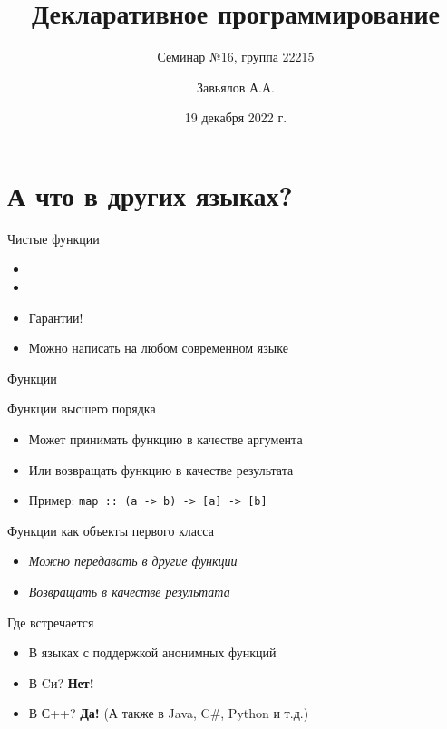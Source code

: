 \documentclass{beamer}
\title{Декларативное программирование}
\subtitle{Семинар №16, группа 22215}
\author{Завьялов А.А.}
\date{19 декабря 2022 г.}
\institute{Кафедра систем информатики ФИТ НГУ}
\newcommand{\hs}[1]{\texttt{#1}}
\begin{document}
  \maketitle
\section{А что в других языках?}
\begin{frame}{Чистые функции}
    \begin{itemize}
        \item {}
        \item {}
        \item \pause Гарантии!
        \item \pause Можно написать на любом современном языке
    \end{itemize}
\end{frame}
\begin{frame}{Функции}
    \begin{block}{Функции высшего порядка}
    \begin{itemize}
        \item Может принимать функцию в качестве аргумента
        \item Или возвращать функцию в качестве результата
        \item Пример: \hs{map :: (a -> b) -> [a] -> [b]}
    \end{itemize}
    \end{block}
    \begin{block}{Функции как объекты первого класса}
        \begin{itemize}
            \item \textit{Можно передавать в другие функции}
            \item \textit{Возвращать в качестве результата}
        \end{itemize}
    \end{block}
    \begin{block}{Где встречается}
        \begin{itemize}
            \item В языках с поддержкой анонимных функций
            \item В Cи? \textbf{Нет!}
            \item В С++? \textbf{Да!} (А также в Java, C\#, Python и т.д.)
        \end{itemize}
    \end{block}
\end{frame}
\end{document}
